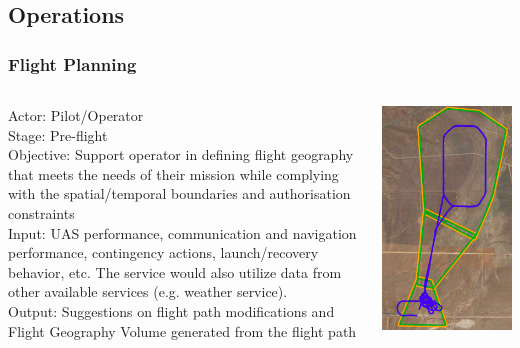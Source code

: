 \documentclass[usenames,dvipsnames,aspectratio=169,serif]{beamer}
\begin{document}
\subsection{Operations}
\begin{frame}
   \frametitle{Flight Planning}
   \begin{columns}[T]
      \begin{column}{0.75\textwidth}
         Actor: Pilot/Operator \\
         Stage: Pre-flight \\
         {Objective: Support operator in defining flight geography that meets the needs of their mission while complying with the spatial/temporal boundaries and authorisation constraints} \\
         Input: UAS performance, communication and navigation performance, contingency actions, launch/recovery behavior, etc. The service would also utilize data from other available services (e.g. weather service). \\
         Output: Suggestions on flight path modifications and Flight Geography Volume generated from the flight path
      \end{column}
      \begin{column}{0.25\textwidth}
         \includegraphics[height=0.75\textheight]{img/flight-planning.png}

\end{column}
\end{columns}
\end{frame}
\end{document}
